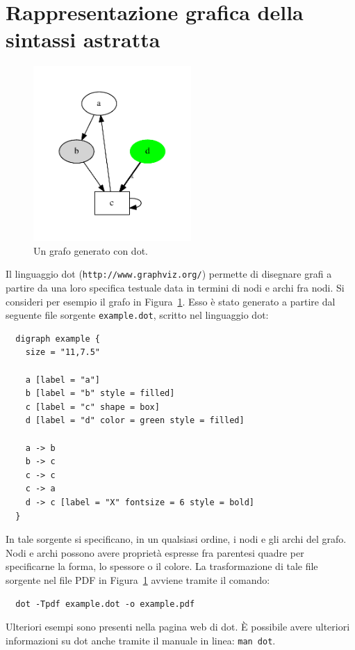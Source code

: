 \section{Rappresentazione grafica della sintassi astratta}
  \label{sec:graphical_abstract_syntax}
%
\begin{figure}
\begin{center}
\includegraphics[width=6cm]{example.pdf}
\end{center}
\caption{Un grafo generato con dot.}\label{fig:dot_example}
\end{figure}
%
Il linguaggio dot (\texttt{http://www.graphviz.org/}) permette di
disegnare grafi a partire da una loro specifica testuale data in
termini di nodi e archi fra nodi. Si consideri per esempio il grafo
in Figura~\ref{fig:dot_example}. Esso \`e stato generato a partire dal
seguente file sorgente \texttt{example.dot}, scritto nel linguaggio dot:
%
\begin{verbatim}
  digraph example {
    size = "11,7.5"

    a [label = "a"]
    b [label = "b" style = filled]
    c [label = "c" shape = box]
    d [label = "d" color = green style = filled]

    a -> b
    b -> c
    c -> c
    c -> a
    d -> c [label = "X" fontsize = 6 style = bold]
  }
\end{verbatim}
%
In tale sorgente si specificano, in un qualsiasi ordine, i nodi e
gli archi del grafo. Nodi e archi possono avere propriet\`a espresse fra
parentesi quadre per specificarne la forma, lo spessore o il colore.
La trasformazione di tale file sorgente nel file PDF in
Figura~\ref{fig:dot_example} avviene tramite il comando:
%
\begin{verbatim}
  dot -Tpdf example.dot -o example.pdf
\end{verbatim}
%
Ulteriori esempi sono presenti nella pagina web di dot.
\`E possibile avere ulteriori informazioni su dot anche tramite
il manuale in linea: \texttt{man dot}.

